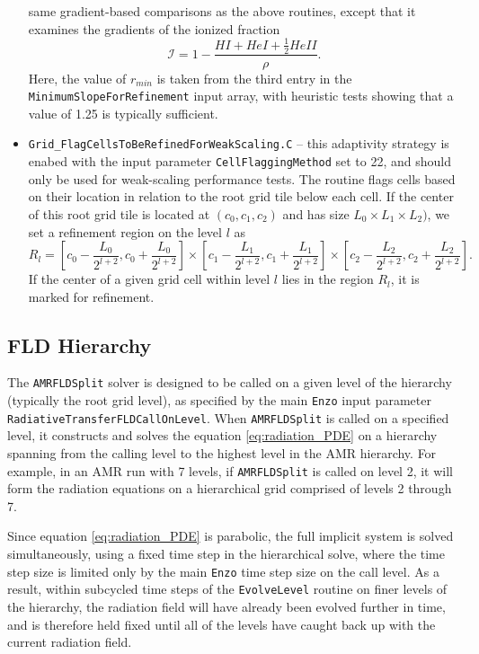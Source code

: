 \documentclass[letterpaper,10pt]{article}
\renewcommand{\(}{\left(}
\renewcommand{\)}{\right)}
\newcommand{\enzo}{{\tt Enzo} }
\begin{document}
\begin{itemize}
  same gradient-based comparisons as the above routines, except that
  it examines the gradients of the ionized fraction
  \[
     \mathcal I = 1 - \frac{HI + HeI + \frac12 HeII}{\rho}.
  \]
  Here, the value of $r_{min}$ is taken from the third entry in the
  {\tt MinimumSlopeForRefinement} input array, with heuristic tests
  showing that a value of 1.25 is typically sufficient.
\item {\tt Grid\_FlagCellsToBeRefinedForWeakScaling.C} -- this
  adaptivity strategy is enabed with the input parameter 
  {\tt CellFlaggingMethod} set to 22, and should only be used for
  weak-scaling performance tests.  The routine flags cells based on
  their location in relation to the root grid tile below each cell.
  If the center of this root grid tile is located at $(c_0, c_1, c_2)$
  and has size $L_0\times L_1\times L_2)$, we set a refinement region
  on the level $l$ as 
  \[
     R_l =  \left[c_0-\frac{L_0}{2^{l+2}}, c_0+\frac{L_0}{2^{l+2}} \right] 
     \times \left[c_1-\frac{L_1}{2^{l+2}}, c_1+\frac{L_1}{2^{l+2}} \right] 
     \times \left[c_2-\frac{L_2}{2^{l+2}}, c_2+\frac{L_2}{2^{l+2}} \right].
  \]
  If the center of a given grid cell within level $l$ lies in the
  region $R_l$, it is marked for refinement. 
\end{itemize}


\subsection{FLD Hierarchy}
\label{sec:AMRFLDSplit_hierarchy}

The {\tt AMRFLDSplit} solver is designed to be called on a given level
of the hierarchy (typically the root grid level), as specified by the
main \enzo input parameter {\tt RadiativeTransferFLDCallOnLevel}.
When {\tt AMRFLDSplit} is called on a specified level, it constructs
and solves the equation \eqref{eq:radiation_PDE} on a hierarchy
spanning from the calling level to the highest level in the AMR
hierarchy.  For example, in an AMR run with 7 levels, if 
{\tt AMRFLDSplit} is called on level 2, it will form the radiation
equations on a hierarchical grid comprised of levels 2 through 7.

Since equation \eqref{eq:radiation_PDE} is parabolic, the full
implicit system is solved simultaneously, using a fixed time step in
the hierarchical solve, where the time step size is limited only by
the main \enzo time step size on the call level.  As a result, within
subcycled time steps of the {\tt EvolveLevel} routine on finer levels
of the hierarchy, the radiation field will have already been evolved
further in time, and is therefore held fixed until all of the levels
have caught back up with the current radiation field.
\end{document}
